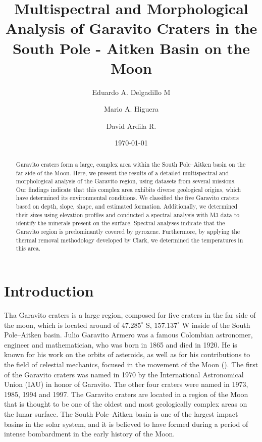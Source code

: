 \documentclass[aps,prd,nofootinbib,superscriptaddress,floatfix,longbibliography,author-year]{revtex4-2}
\begin{document}
\title{Multispectral and Morphological Analysis of Garavito Craters in the South Pole - Aitken Basin on the Moon}

\author{Eduardo A. Delgadillo M}
\author{Mario A. Higuera}

\author{David Ardila R.}

\date{\today}

\begin{abstract}
Garavito craters form a large, complex area within the South Pole–Aitken basin on the far side of the Moon. Here, we present the results of a detailed multispectral and morphological analysis of the Garavito region, using datasets from several missions. Our findings indicate that this complex area exhibits diverse geological origins, which have determined its environmental conditions.
We classified the five Garavito craters based on depth, slope, shape, and estimated formation. Additionally, we determined their sizes using elevation profiles and conducted a spectral analysis with M3 data to identify the minerals present on the surface. Spectral analyses indicate that the Garavito region is predominantly covered by pyroxene. Furthermore, by applying the thermal removal methodology developed by Clark, we determined the temperatures in this area.
\end{abstract}

\maketitle

\section{Introduction}
Tha Garavito craters is a large region, composed for five craters in  the far side of the moon, which is located around of $47.285^\circ$ S, $157.137^\circ$ W inside of the South Pole–Aitken basin. Julio Garavito Armero was a famous Colombian astronomer, engineer and mathematician, who was born in 1865 and died in 1920. He is known for his work on the orbits of asteroids, as well as for his contributions to the field of celestial mechanics, focused in the movement of the Moon (\citet{Sanchez2025}). The first of the Garavito craters was named in 1970 by the International Astronomical Union (IAU) in honor of Garavito. The other four craters were named in 1973, 1985, 1994 and 1997. The Garavito craters are located in a region of the Moon that is thought to be one of the oldest and most geologically complex areas on the lunar surface. The South Pole–Aitken basin is one of the largest impact basins in the solar system, and it is believed to have formed during a period of intense bombardment in the early history of the Moon.
\end{document}
